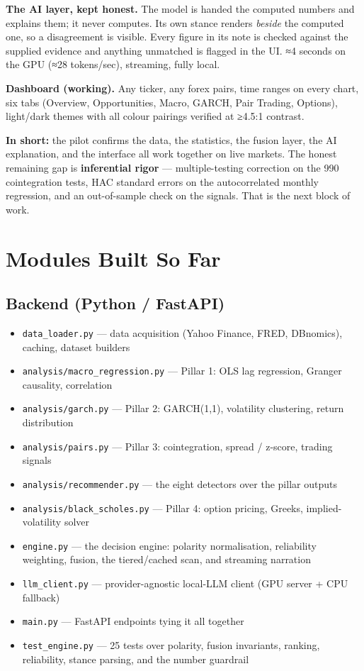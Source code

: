 \documentclass[11pt]{article}
\newcommand{\tk}[1]{\texttt{#1}}
\begin{document}
\textbf{The AI layer, kept honest.} The model is handed the computed numbers and
explains them; it never computes. Its own stance renders \emph{beside} the computed
one, so a disagreement is visible. Every figure in its note is checked against the
supplied evidence and anything unmatched is flagged in the UI. ≈4 seconds on the GPU
(≈28 tokens/sec), streaming, fully local.

\textbf{Dashboard (working).} Any ticker, any forex pairs, time ranges on every chart,
six tabs (Overview, Opportunities, Macro, GARCH, Pair Trading, Options), light/dark
themes
with all colour pairings verified at ≥4.5:1 contrast.

\begin{opp}
\textbf{In short:} the pilot confirms the data, the statistics, the fusion layer, the
AI explanation, and the interface all work together on live markets. The honest
remaining gap is \textbf{inferential rigor} — multiple-testing correction on the 990
cointegration tests, HAC standard errors on the autocorrelated monthly regression, and
an out-of-sample check on the signals. That is the next block of work.
\end{opp}

\section{Modules Built So Far}

\subsection*{Backend (Python / FastAPI)}
\begin{itemize}
\item \tk{data\_loader.py} — data acquisition (Yahoo Finance, FRED, DBnomics), caching, dataset builders
\item \tk{analysis/macro\_regression.py} — Pillar 1: OLS lag regression, Granger causality, correlation
\item \tk{analysis/garch.py} — Pillar 2: GARCH(1,1), volatility clustering, return distribution
\item \tk{analysis/pairs.py} — Pillar 3: cointegration, spread / z-score, trading signals
\item \tk{analysis/recommender.py} — the eight detectors over the pillar outputs
\item \tk{analysis/black\_scholes.py} — Pillar 4: option pricing, Greeks, implied-volatility solver
\item \tk{engine.py} — the decision engine: polarity normalisation, reliability
weighting, fusion, the tiered/cached scan, and streaming narration
\item \tk{llm\_client.py} — provider-agnostic local-LLM client (GPU server + CPU fallback)
\item \tk{main.py} — FastAPI endpoints tying it all together
\item \tk{test\_engine.py} — 25 tests over polarity, fusion invariants, ranking,
reliability, stance parsing, and the number guardrail
\end{itemize}
\end{document}
